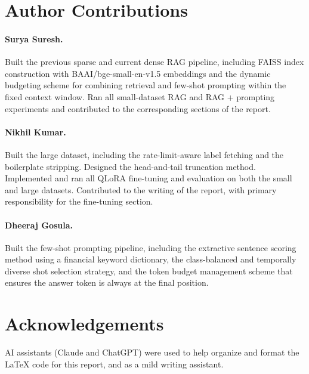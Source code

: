 \documentclass[11pt]{article}
\begin{document}
\section*{Author Contributions}

\paragraph{Surya Suresh.}
Built the previous sparse and current dense RAG pipeline, including FAISS index construction
with BAAI/bge-small-en-v1.5 embeddings and the dynamic budgeting scheme for combining retrieval
and few-shot prompting within the fixed context window. Ran all small-dataset RAG and RAG + prompting experiments and
contributed to the corresponding sections of the report.

\paragraph{Nikhil Kumar.}
Built the large dataset, including the rate-limit-aware label
fetching and the boilerplate stripping. Designed the head-and-tail
truncation method. Implemented and ran all QLoRA fine-tuning and
evaluation on both the small and large datasets. Contributed to the
writing of the report, with primary responsibility for the
fine-tuning section.

\paragraph{Dheeraj Gosula.}
Built the few-shot prompting pipeline, including the extractive sentence scoring method using a financial keyword dictionary, the class-balanced and temporally diverse shot selection strategy, and the token budget management scheme that ensures the answer token is always at the final position.

\section*{Acknowledgements}

AI assistants (Claude and ChatGPT) were used to help organize and
format the LaTeX code for this report, and as a mild writing
assistant.
\end{document}
